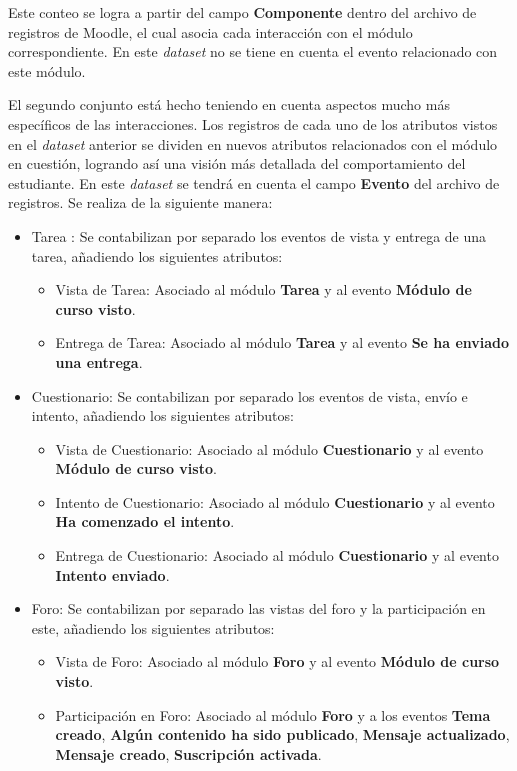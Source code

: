 Este conteo se logra a partir del campo \textbf{Componente} dentro del archivo de registros de Moodle, el cual asocia cada interacción con el módulo correspondiente. En este \textit{dataset} no se tiene en cuenta el evento relacionado con este módulo.  


El segundo conjunto está hecho teniendo en cuenta aspectos mucho más específicos de las interacciones. Los registros de cada uno de los atributos vistos en el \textit{dataset} anterior se dividen en nuevos atributos relacionados con el módulo en cuestión, logrando así una visión más detallada del comportamiento del estudiante. En este \textit{dataset} se tendrá en cuenta el campo \textbf{Evento} del archivo de registros.  Se realiza de la siguiente manera:  
\begin{itemize}
    \item Tarea : Se contabilizan por separado los eventos de vista y entrega de una tarea, añadiendo los siguientes atributos:
    \begin{itemize}
        \item Vista de Tarea: Asociado al módulo \textbf{Tarea} y al evento \textbf{Módulo de curso visto}.
        \item Entrega de Tarea: Asociado al módulo \textbf{Tarea} y al evento \textbf{Se ha enviado una entrega}.
    \end{itemize}
    \item Cuestionario: Se contabilizan por separado los eventos de vista, envío e intento, añadiendo los siguientes atributos:
    \begin{itemize}
        \item Vista de Cuestionario: Asociado al módulo \textbf{Cuestionario} y al evento \textbf{Módulo de curso visto}.
        \item Intento de Cuestionario: Asociado al módulo \textbf{Cuestionario} y al evento \textbf{Ha comenzado el intento}.
        \item Entrega de Cuestionario: Asociado al módulo \textbf{Cuestionario} y al evento \textbf{Intento enviado}.
    \end{itemize}
    \item Foro: Se contabilizan por separado las vistas del foro y la participación en este, añadiendo los siguientes atributos:
    \begin{itemize}
        \item Vista de Foro: Asociado al módulo \textbf{Foro} y al evento \textbf{Módulo de curso visto}.
        \item Participación en Foro: Asociado al módulo \textbf{Foro} y a los eventos \textbf{Tema creado}, \textbf{Algún contenido ha sido publicado}, \textbf{Mensaje actualizado}, \textbf{Mensaje creado}, \textbf{Suscripción activada}.
    \end{itemize}
\end{itemize}

